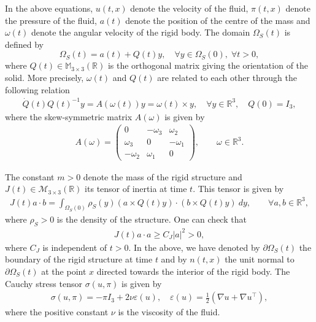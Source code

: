 \documentclass[12pt,a4paper,reqno]{amsart}
\theoremstyle{definition}
\theoremstyle{remark}
\numberwithin{equation}{section}
\newcommand{\ost}{\Omega_{S}(t)}
\newcommand{\oso}{\Omega_{S}(0)}
\newcommand{\rt}{\mathbb{R}^{3}}
\newcommand{\post}{\partial \ost}
\begin{document}
 In the above equations, $u(t,x)$ denote the velocity of the fluid, $\pi(t,x)$ denote the pressure of the fluid, $a(t)$ denote the position of the centre of the mass and $\omega(t)$ denote the angular velocity of the rigid body.  The domain $\Omega_{S}(t)$ is defined by
\[ \ost = a(t) + Q(t)y, \quad \forall y \in \Omega_{S}(0), \; \forall t > 0, \]
where $Q(t) \in \mathbb{M}_{3\times 3}(\mathbb{R})$ is the  orthogonal matrix giving the orientation of the solid. More precisely, $\omega(t)$ and $Q(t)$ are related to each other through the following relation
\begin{align} \label{eqQ}
\dot Q(t)Q(t)^{-1} y = A(\omega(t)) y =  \omega(t) \times y, \quad \forall y \in \mathbb{R}^{3}, \quad Q(0) = I_{3},
\end{align}
where the skew-symmetric matrix $A(\omega)$ is given by
\begin{align*}
A(\omega) = \begin{pmatrix}
0 & -\omega_{3} & \omega_{2} \\ \omega_{3} & 0 & -\omega_{1} \\ -\omega_{2} & \omega_{1} & 0
\end{pmatrix}, \qquad  \omega \in \mathbb{R}^{3}.
\end{align*}

The constant $m > 0$ denote  the mass of the rigid structure and $J(t) \in \mathcal{M}_{3 \times 3} (\mathbb{R})$ its tensor of inertia at time $t.$ This tensor is given by
\begin{align} \label{tensor}
J(t) a \cdot b = \int_{\oso} \rho_{S}(y) (a \times Q(t)y) \cdot (b \times Q(t)y) \ dy, \qquad \forall a,b \in \rt,
\end{align}
where $\rho_{S} > 0$ is the density of the structure.  One can check that
\begin{align}
J(t) a \cdot a\geqslant C_{J} |a|^{2} > 0,
\end{align}
where $C_{J}$ is independent of $t > 0.$ In the above,  we have denoted by $\post$ the boundary of the rigid structure at time $t$ and by $n(t,x)$ the unit normal to $\partial \ost$ at the point $x$
directed towards the interior of the rigid body. The Cauchy stress tensor  $\sigma(u,\pi)$ is given by
\begin{align}
\sigma(u,\pi) = -\pi I_{3} + 2\nu \varepsilon(u), \quad \varepsilon(u) = \frac{1}{2}\left(\nabla u + \nabla u ^{\top} \right),
\end{align}
where the positive constant $\nu $ is the viscosity of the fluid.
\end{document}
